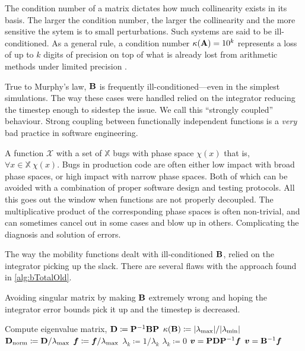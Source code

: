 The condition number of a matrix dictates how much collinearity exists in its basis. The larger the condition number, the larger the collinearity and the more sensitive the sytem is to small perturbations. Such systems are said to be ill-conditioned. As a general rule, a condition number $\kappa(\mathbf{A}) = 10^k$ represents a loss of up to $k$ digits of precision on top of what is already lost from arithmetic methods under limited precision \cite{cheney2012numerical}.

True to Murphy's law, $\mathbf{B}$ is frequently ill-conditioned---even in the simplest simulations. The way these cases were handled relied on the integrator reducing the timestep enough to sidestep the issue. We call this ``strongly coupled'' behaviour. Strong coupling between functionally independent functions is a \emph{very} bad practice in software engineering.

A function $\mathcal{X}$ with a set of $\mathbb{X}$ bugs with phase space $\chi(x)$ that is, $\forall x \in \mathbb{X}~ \chi(x)$. Bugs in production code are often either low impact with broad phase spaces, or high impact with narrow phase spaces. Both of which can be avoided with a combination of proper software design and testing protocols. All this goes out the window when functions are not properly decoupled. The multiplicative product of the corresponding phase spaces is often non-trivial, and can sometimes cancel out in some cases and blow up in others. Complicating the diagnosis and solution of errors.

The way the mobility functions dealt with ill-conditioned $\mathbf{B}$, relied on the integrator picking up the slack. There are several flaws with the approach found in \cref{alg:bTotalOld}.
\begin{algorithm}
    \caption{Avoiding singular matrix by making $\mathbf{B}$ extremely wrong and hoping the integrator error bounds pick it up and the timestep is decreased.}
    \label{alg:bTotalOld}
    \begin{algorithmic}
        \State Compute eigenvalue matrix, $\mathbf{D} \coloneqq \mathbf{P}^{-1} \mathbf{B} \mathbf{P}$
        \State $\kappa(\mathbf{B}) \coloneqq \lvert \lambda_{\textrm{max}} \rvert/ \lvert \lambda_{\textrm{min}} \rvert$
        \State $\mathbf{D}_{\textrm{norm}} \coloneqq \mathbf{D} / \lambda_{\textrm{max}}$
        \State $\vec{f} \coloneqq \vec{f} / \lambda_{\rvar{max}}$
        \State $\lambda_k \coloneqq 1/\lambda_k$
        \Else
        \State $\lambda_k \coloneqq 0$
        \EndIf
        \EndFor
        \State $\vec{v} = \mtx{P} \mtx{D} \mtx{P}^{-1} \vec{f}$
        \Else
        \State $\vec{v} = \mtx{B}^{-1} \vec{f}$
        \EndIf
    \end{algorithmic}
\end{algorithm}

